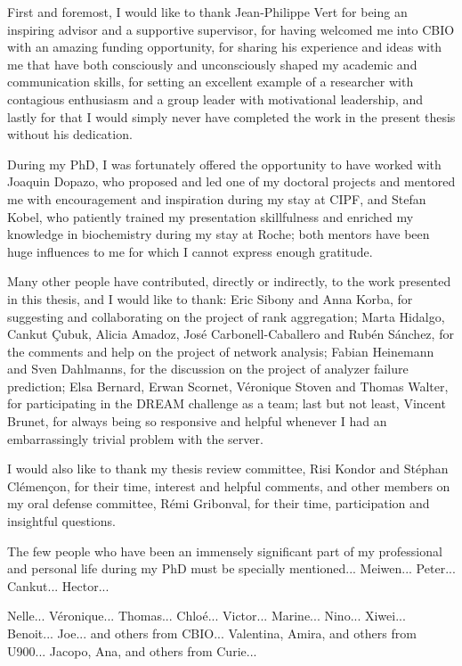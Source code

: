 First and foremost, I would like to thank Jean-Philippe Vert for being an inspiring advisor and a supportive supervisor, for having welcomed me into CBIO with an amazing funding opportunity, for sharing his experience and ideas with me that have both consciously and unconsciously shaped my academic and communication skills, for setting an excellent example of a researcher with contagious enthusiasm and a group leader with motivational leadership, and lastly for that I would simply never have completed the work in the present thesis without his dedication.


During my PhD, I was fortunately offered the opportunity to have worked with Joaquin Dopazo, who proposed and led one of my doctoral projects and mentored me with encouragement and inspiration during my stay at CIPF, and Stefan Kobel, who patiently trained my presentation skillfulness and enriched my knowledge in biochemistry during my stay at Roche; both mentors have been huge influences to me for which I cannot express enough gratitude.


Many other people have contributed, directly or indirectly, to the work presented in this thesis, and I would like to thank: Eric Sibony and Anna Korba, for suggesting and collaborating on the project of rank aggregation; Marta Hidalgo, Cankut \c{C}ubuk, Alicia Amadoz, Jos\'{e} Carbonell-Caballero and Rub\'{e}n S\'{a}nchez, for the comments and help on the project of network analysis; Fabian Heinemann and Sven Dahlmanns, for the discussion on the project of analyzer failure prediction; Elsa Bernard, Erwan Scornet, V\'{e}ronique Stoven and Thomas Walter, for participating in the DREAM challenge as a team; last but not least, Vincent Brunet, for always being so responsive and helpful whenever I had an embarrassingly trivial problem with the server.


I would also like to thank my thesis review committee, Risi Kondor and St\'{e}phan Cl\'{e}men\c{c}on, for their time, interest and helpful comments, and other members on my oral defense committee, R\'{e}mi Gribonval, for their time, participation and insightful questions.


The few people who have been an immensely significant part of my professional and personal life during my PhD must be specially mentioned... Meiwen... Peter... Cankut... Hector...


Nelle... V\'{e}ronique... Thomas... Chlo\'{e}... Victor... Marine... Nino... Xiwei... Benoit... Joe... and others from CBIO... Valentina, Amira, and others from U900... Jacopo, Ana, and others from Curie...


